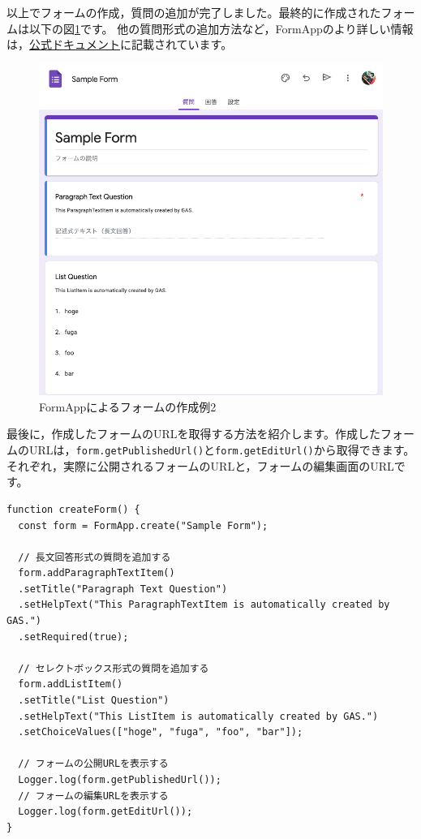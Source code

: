 \documentclass[uplatex,a4j]{jsarticle}
\begin{document}
以上でフォームの作成，質問の追加が完了しました。最終的に作成されたフォームは以下の図\ref{fig:form_sample3}です。
他の質問形式の追加方法など，FormAppのより詳しい情報は，\href{https://developers.google.com/apps-script/reference/forms}{公式ドキュメント}に記載されています。

\begin{figure}[H]
 \centering
 \includegraphics[keepaspectratio, scale=0.5]{images/form_sample3.png}
 \caption{FormAppによるフォームの作成例2}
 \label{fig:form_sample3}
\end{figure}

最後に，作成したフォームのURLを取得する方法を紹介します。作成したフォームのURLは，\verb|form.getPublishedUrl()|と\verb|form.getEditUrl()|から取得できます。それぞれ，実際に公開されるフォームのURLと，フォームの編集画面のURLです。

\begin{lstlisting}[basicstyle=\ttfamily\footnotesize,frame=single,caption=FormApp sample 6]
function createForm() {
  const form = FormApp.create("Sample Form");
  
  // 長文回答形式の質問を追加する
  form.addParagraphTextItem()
  .setTitle("Paragraph Text Question")
  .setHelpText("This ParagraphTextItem is automatically created by GAS.")
  .setRequired(true);
  
  // セレクトボックス形式の質問を追加する
  form.addListItem()
  .setTitle("List Question")
  .setHelpText("This ListItem is automatically created by GAS.")
  .setChoiceValues(["hoge", "fuga", "foo", "bar"]);
  
  // フォームの公開URLを表示する
  Logger.log(form.getPublishedUrl());
  // フォームの編集URLを表示する
  Logger.log(form.getEditUrl());
}
\end{lstlisting}
\end{document}
